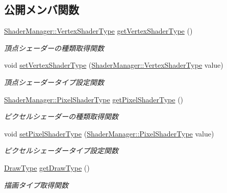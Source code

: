 \subsection*{公開メンバ関数}
\begin{DoxyCompactItemize}
\item 
\mbox{\hyperlink{class_shader_manager_a9b51e49d70eb3cc58f6d1f3994e8cfbd}{Shader\+Manager\+::\+Vertex\+Shader\+Type}} \mbox{\hyperlink{class_draw_order_list_acf4c6c92ca4105bf6101a7c99e134aa1}{get\+Vertex\+Shader\+Type}} ()
\begin{DoxyCompactList}\small\item\em 頂点シェーダーの種類取得関数 \end{DoxyCompactList}\item 
void \mbox{\hyperlink{class_draw_order_list_ad813fde8368b6e8ae6ba373edd0a0a42}{set\+Vertex\+Shader\+Type}} (\mbox{\hyperlink{class_shader_manager_a9b51e49d70eb3cc58f6d1f3994e8cfbd}{Shader\+Manager\+::\+Vertex\+Shader\+Type}} value)
\begin{DoxyCompactList}\small\item\em 頂点シェーダータイプ設定関数 \end{DoxyCompactList}\item 
\mbox{\hyperlink{class_shader_manager_a7d15d773b3c6a99dd7086c45c8b0be5f}{Shader\+Manager\+::\+Pixel\+Shader\+Type}} \mbox{\hyperlink{class_draw_order_list_afc56377beda4eabbf20c5115c3a26ef7}{get\+Pixel\+Shader\+Type}} ()
\begin{DoxyCompactList}\small\item\em ピクセルシェーダーの種類取得関数 \end{DoxyCompactList}\item 
void \mbox{\hyperlink{class_draw_order_list_a761f6f76271366ad3c0203b098087914}{set\+Pixel\+Shader\+Type}} (\mbox{\hyperlink{class_shader_manager_a7d15d773b3c6a99dd7086c45c8b0be5f}{Shader\+Manager\+::\+Pixel\+Shader\+Type}} value)
\begin{DoxyCompactList}\small\item\em ピクセルシェーダータイプ設定関数 \end{DoxyCompactList}\item 
\mbox{\hyperlink{class_draw_order_list_a6c9b9ceb312c16d399ef355f4f3486bb}{Draw\+Type}} \mbox{\hyperlink{class_draw_order_list_a88af7401a2ecb32be3fcf5408946cd29}{get\+Draw\+Type}} ()
\begin{DoxyCompactList}\small\item\em 描画タイプ取得関数 \end{DoxyCompactList}\item 

\end{DoxyCompactItemize}
